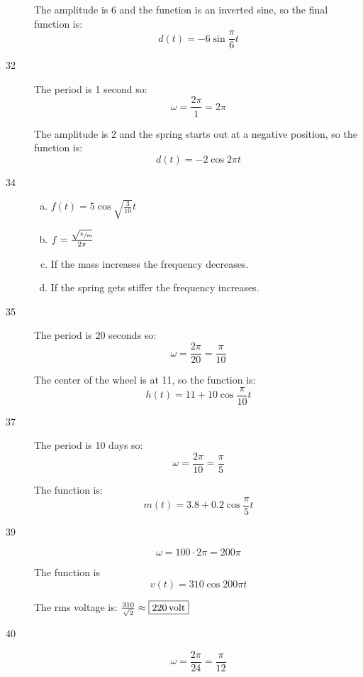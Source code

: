 \documentclass{exam}
\begin{document}
\begin{description}
        The amplitude is 6 and the function is an inverted sine, so the final function is:
        \[
          \boxed{ d(t) = -6 \sin \frac{\pi}{6} t }
        \]

      \item[32] The period is 1 second so: 
        \[
          \omega = \frac{2 \pi}{1} = 2 \pi
        \]

        The amplitude is 2 and the spring starts out at a negative position, so the function is:
        \[
          \boxed{ d(t) = -2 \cos 2 \pi t }
        \]

      \item[34]
        \begin{enumerate}[(a)]
          \item $f(t) = 5 \cos \sqrt{\frac{3}{10}} t$

          \item $f = \frac{ \sqrt{\sfrac{k}{m}} }{2 \pi}$

          \item If the mass increases the frequency decreases.

          \item If the spring gets stiffer the frequency increases.

        \end{enumerate}

      \item[35] The period is 20 seconds so: 
        \[
          \omega = \frac{2 \pi}{20} = \frac{\pi}{10}
        \]

        The center of the wheel is at 11, so the function is:
        \[
          \boxed{ h(t) = 11 + 10 \cos \frac{\pi}{10} t }
        \]

      \item[37] The period is 10 days so: 
        \[
          \omega = \frac{2 \pi}{10} = \frac{\pi}{5}
        \]

        The function is:
        \[
          \boxed{ m(t) = 3.8 + 0.2 \cos \frac{\pi}{5} t }
        \]

      \item[39]
        \[
          \omega = 100 \cdot 2 \pi = 200 \pi
        \]

        The function is
        \[
          \boxed{ v(t) = 310 \cos 200 \pi t }
        \]

        The rms voltage is: $\frac{310}{\sqrt{2}} \approx \boxed{ \unit[ 220 ]{ volt } }$ 

      \item[40]
        \[
          \omega = \frac{2 \pi}{24} = \frac{\pi}{12}
        \]


\end{description}
\end{document}
